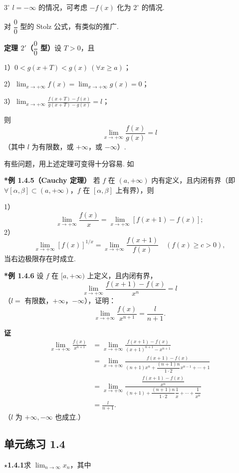 \documentclass[UTF8, 12pt, fontset=fandol, oneside]{ctexart}
\begin{document}
$3^\circ$ $l=-\infty$ 的情况，可考虑 $-f(x)$ 化为 $2^\circ$ 的情况.

对 $\dfrac00$ 型的 Stolz 公式，有类似的推广.

\noindent\textbf{定理 $2'$（$\dfrac00$ 型）}\quad 设 $T>0$，且

1）$0<g(x+T)<g(x)\ (\forall x\ge a)$；

2）$\displaystyle\lim_{x\to+\infty}f(x)=\lim_{x\to+\infty}g(x)=0$；

3）$\displaystyle\lim_{x\to+\infty}\frac{f(x+T)-f(x)}{g(x+T)-g(x)}=l$；

则
\[
  \lim_{x\to+\infty}\frac{f(x)}{g(x)}=l
\]
（其中 $l$ 为有限数，或 $+\infty$，或 $-\infty$）.

有些问题，用上述定理可变得十分容易. 如

\noindent\textbf{*例 1.4.5（Cauchy 定理）}\quad
若 $f$ 在 $(a,+\infty)$ 内有定义，且内闭有界（即 $\forall[\alpha,\beta]\subset(a,+\infty)$，$f$ 在 $[\alpha,\beta]$ 上有界），则

1）
\[
  \lim_{x\to+\infty}\frac{f(x)}x
  =\lim_{x\to+\infty}[f(x+1)-f(x)];
\]
2）
\[
  \lim_{x\to+\infty}[f(x)]^{1/x}
  =\lim_{x\to+\infty}\frac{f(x+1)}{f(x)}
  \quad(f(x)\ge c>0),
\]
当右边极限存在时成立.

\noindent\textbf{*例 1.4.6}\quad
设 $f$ 在 $[a,+\infty)$ 上定义，且内闭有界，
\[
  \lim_{x\to+\infty}\frac{f(x+1)-f(x)}{x^n}=l
\]
（$l=$ 有限数，$+\infty$，$-\infty$），证明：
\[
  \lim_{x\to+\infty}\frac{f(x)}{x^{n+1}}=\frac{l}{n+1}.
\]

\noindent\textbf{证}\quad
\[
\begin{aligned}
  \lim_{x\to+\infty}\frac{f(x)}{x^{n+1}}
  &=\lim_{x\to+\infty}
  \frac{f(x+1)-f(x)}{(x+1)^{n+1}-x^{n+1}}\\
  &=\lim_{x\to+\infty}
  \frac{f(x+1)-f(x)}
  {(n+1)x^n+\dfrac{(n+1)n}{1\cdot2}x^{n-1}+\cdots+1}\\
  &=\lim_{x\to+\infty}
  \frac{\dfrac{f(x+1)-f(x)}{x^n}}
  {(n+1)+\dfrac{(n+1)n}{1\cdot2}\dfrac1x+\cdots+\dfrac1{x^n}}\\
  &=\frac{l}{n+1}.
\end{aligned}
\]
（$l$ 为 $+\infty,-\infty$ 也成立.）

\subsection*{单元练习 1.4}

\noindent\textbf{$\star$1.4.1}\quad 求 $\displaystyle\lim_{n\to\infty}x_n$，其中
\end{document}
